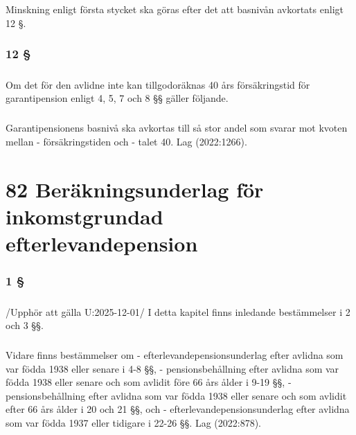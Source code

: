 \documentclass[a4paper,notitlepage,openany,10pt]{book}
\begin{document}
\paragraph*{}
Minskning enligt första stycket ska göras efter det att basnivån avkortats enligt 12 §.
\subsection*{12 §}
\paragraph*{}
Om det för den avlidne inte kan tillgodoräknas 40 års försäkringstid för garantipension enligt 4, 5, 7 och 8 §§ gäller följande.
\paragraph*{}
Garantipensionens basnivå ska avkortas till så stor andel som svarar mot kvoten mellan
\newline - försäkringstiden och
\newline - talet 40.
Lag (2022:1266).
\chapter*{82 Beräkningsunderlag för inkomstgrundad efterlevandepension}
\subsection*{1 §}
\paragraph*{}
/Upphör att gälla U:2025-12-01/
I detta kapitel finns inledande bestämmelser i 2 och 3 §§.
\paragraph*{}
Vidare finns bestämmelser om
\newline - efterlevandepensionsunderlag efter avlidna som var födda 1938 eller senare i 4-8 §§,
\newline - pensionsbehållning efter avlidna som var födda 1938 eller senare och som avlidit före 66 års ålder i 9-19 §§,
\newline - pensionsbehållning efter avlidna som var födda 1938 eller senare och som avlidit efter 66 års ålder i 20 och 21 §§, och
\newline - efterlevandepensionsunderlag efter avlidna som var födda 1937 eller tidigare i 22-26 §§.
Lag (2022:878).
\end{document}
